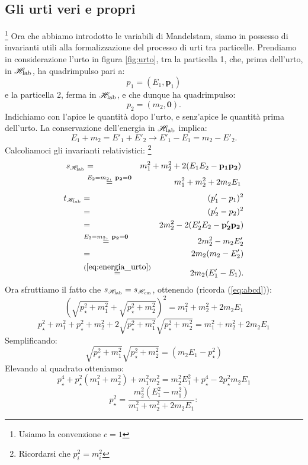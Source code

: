 \subsection{ Gli urti veri e propri}
\footnote{ Usiamo la convenzione $c=1$} Ora che abbiamo introdotto
le variabili di Mandelstam, siamo in possesso di invarianti utili
alla formalizzazione del processo di urti tra particelle.
Prendiamo in considerazione l'urto in figura \vref{fig:urto}, tra
la particella 1, che, prima dell'urto, in $\mathscr{H}_{\mathrm{lab}}$, ha quadrimpulso
pari a:
$$
p_1=(E_1,\mathbf{p}_1)
$$
e la particella 2, ferma in $\mathscr{H}_{\mathrm{lab}}$, e che dunque ha quadrimpulso:
$$
p_2=(m_2,\mathbf{0}).
$$
Indichiamo con l'apice le quantit\`a dopo l'urto, e senz'apice le
quantit\`a prima dell'urto. La conservazione dell'energia in
$\mathscr{H}_{\mathrm{lab}}$ implica:
\begin{equation}
E_1 + m_2 = E'_1 + E'_2 \longrightarrow E'_1 - E_1 = m_2 - E'_2.
\label{eq:energia_urto}
\end{equation}
Calcoliamoci gli invarianti relativistici:
\footnote{Ricordarsi che $p_i^2 = m_i^2$}
\begin{eqnarray*}
s_{\mathscr{H}_{\mathrm{lab}}} &=& m_1^2 + m_2^2 + 2 (E_1 E_2 - \mathbf{p_1}\mathbf{p_2})\\
& \stackrel{E_2 = m_2,\;\; \mathbf{p_2}=\mathbf{0}}{=} & m_1^2 +
m_2^2 + 2 m_2 E_1
\end{eqnarray*}
\begin{eqnarray*}
t_{\mathscr{H}_{\mathrm{lab}}} & = &  (p'_1-p_1)^2 \\ & = & (p'_2-p_2)^2  \\ & = & 2
m_2^2 -2 (E'_2 E_2 - \mathbf{p'_2}\mathbf{p_2})  \\ & \stackrel{
E_2 = m_2,\;\;\mathbf{p_2} = \mathbf{0} }{=} & 2 m_2^2 - m_2 E'_2 \\
& = & 2 m_2 (m_2 - E'_2) \\ &
\stackrel{(\ref{eq:energia_urto})}{=} & 2 m_2 (E'_1 - E_1).
\end{eqnarray*}
Ora sfruttiamo il fatto che $s_{\mathscr{H}_{\mathrm{lab}}}=s_{\mathscr{H}_{\mathrm{cm}}}$, ottenendo
(ricorda (\ref{eq:abcd})):
$$
\left(\sqrt{p_{\star}^2 + m_1^2} + \sqrt{p_{\star}^2 +
m_2^2}\right)^2 = m_1^2 + m_2^2 + 2 m_2 E_1
$$
$$
p_{\star}^2 + m_1^2 + p_{\star}^2 + m_2^2 + 2 \sqrt{p_{\star}^2 +
m_1^2}  \sqrt{p_{\star}^2 + m_2^2} = m_1^2 + m_2^2 + 2 m_2 E_1
$$
Semplificando:
$$
\sqrt{p_{\star}^2 + m_1^2}  \sqrt{p_{\star}^2 + m_2^2} = ( m_2 E_1
- p_{\star}^2)
$$
Elevando al quadrato otteniamo:
$$
p_{\star}^4 + p_{\star}^2 (m_1^2 + m_2^2) + m_1^2  m_2^2 = m_2^2
E_1^2 + p_{\star}^4 - 2 p_{\star}^2 m_2 E_1
$$
$$ p_{\star}^2 = \frac{m_2^2 (E_1^2 - m_1^2)}{m_1^2 + m_2^2 + 2
m_2 E_1}:
$$
